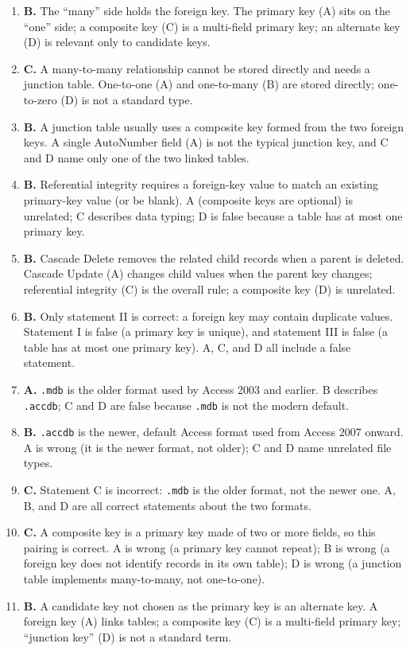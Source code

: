 \documentclass[11pt]{article}
\begin{document}
\begin{enumerate}[label=\textbf{Q\arabic*.}, leftmargin=*]
  zero-to-one (D) is not a standard Access relationship type.
\item \textbf{B.} The ``many'' side holds the foreign key. The primary key
  (A) sits on the ``one'' side; a composite key (C) is a multi-field primary
  key; an alternate key (D) is relevant only to candidate keys.
\item \textbf{C.} A many-to-many relationship cannot be stored directly and
  needs a junction table. One-to-one (A) and one-to-many (B) are stored
  directly; one-to-zero (D) is not a standard type.
\item \textbf{B.} A junction table usually uses a composite key formed from
  the two foreign keys. A single AutoNumber field (A) is not the typical
  junction key, and C and D name only one of the two linked tables.
\item \textbf{B.} Referential integrity requires a foreign-key value to match
  an existing primary-key value (or be blank). A (composite keys are optional)
  is unrelated; C describes data typing; D is false because a table has at
  most one primary key.
\item \textbf{B.} Cascade Delete removes the related child records when a
  parent is deleted. Cascade Update (A) changes child values when the parent
  key changes; referential integrity (C) is the overall rule; a composite key
  (D) is unrelated.
\item \textbf{B.} Only statement II is correct: a foreign key may contain
  duplicate values. Statement I is false (a primary key is unique), and
  statement III is false (a table has at most one primary key). A, C, and D
  all include a false statement.
\item \textbf{A.} \texttt{.mdb} is the older format used by Access 2003 and
  earlier. B describes \texttt{.accdb}; C and D are false because
  \texttt{.mdb} is not the modern default.
\item \textbf{B.} \texttt{.accdb} is the newer, default Access format used
  from Access 2007 onward. A is wrong (it is the newer format, not older); C
  and D name unrelated file types.
\item \textbf{C.} Statement C is incorrect: \texttt{.mdb} is the older
  format, not the newer one. A, B, and D are all correct statements about the
  two formats.
\item \textbf{C.} A composite key is a primary key made of two or more
  fields, so this pairing is correct. A is wrong (a primary key cannot
  repeat); B is wrong (a foreign key does not identify records in its own
  table); D is wrong (a junction table implements many-to-many, not
  one-to-one).
\item \textbf{B.} A candidate key not chosen as the primary key is an
  alternate key. A foreign key (A) links tables; a composite key (C) is a
  multi-field primary key; ``junction key'' (D) is not a standard term.


\end{enumerate}
\end{document}
